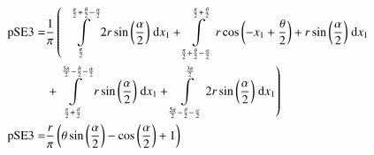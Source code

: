 \begin{align}
    \mathrm{pSE3} =&\frac{1}{\pi} \left(\;\;\int\limits_{\frac{\pi}{2}}^{\frac{\pi}{2} + \frac{\theta}{2} - \frac{\alpha}{2}}2 r \sin{\left (\frac{\alpha}{2} \right )}\;\mathrm{d}x_{1}+\int\limits_{\frac{\pi}{2} + \frac{\theta}{2} - \frac{\alpha}{2}}^{\frac{\pi}{2} + \frac{\theta}{2}}r \cos{\left (- x_{1} + \frac{\theta}{2} \right )} + r \sin{\left (\frac{\alpha}{2} \right )}\;\mathrm{d}x_{1}\right.\notag\\
 &\left.+\int\limits_{\frac{\pi}{2} + \frac{\theta}{2}}^{\frac{5 \pi}{2} - \frac{\theta}{2} - \frac{\alpha}{2}}r \sin{\left (\frac{\alpha}{2} \right )}\;\mathrm{d}x_{1}+\int\limits_{\frac{5 \pi}{2} - \frac{\theta}{2} - \frac{\alpha}{2}}^{\frac{3 \pi}{2}}2 r \sin{\left (\frac{\alpha}{2} \right )}\;\mathrm{d}x_{1}\right)\label{pSE3Def}\\
    \mathrm{pSE3} =& \frac{r}{\pi} \left(\theta \sin{\left (\frac{\alpha}{2} \right )} - \cos{\left (\frac{\alpha}{2} \right )} + 1\right)\label{pSE3Sln}
\end{align}